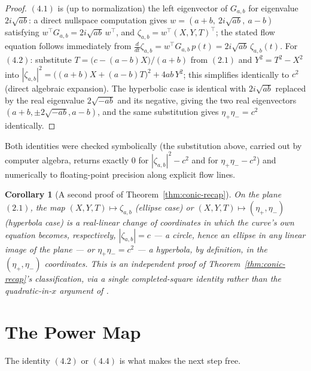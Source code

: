 \documentclass[11pt]{amsart}
\newtheorem{corollary}[theorem]{Corollary}
\theoremstyle{remark}
\begin{document}
\begin{proof}
$(4.1)$ is (up to normalization) the left eigenvector of $G_{a,b}$ for eigenvalue $2i\sqrt{ab}$: a direct nullspace computation gives $w=(a+b,\ 2i\sqrt{ab},\ a-b)$ satisfying $w^\top G_{a,b}=2i\sqrt{ab}\,w^\top$, and $\zeta_{a,b}=w^\top(X,Y,T)^\top$; the stated flow equation follows immediately from $\frac{d}{dt}\zeta_{a,b}=w^\top G_{a,b}\,p(t)=2i\sqrt{ab}\,\zeta_{a,b}(t)$. For $(4.2)$: substitute $T=\bigl(c-(a-b)X\bigr)/(a+b)$ from $(2.1)$ and $Y^2=T^2-X^2$ into $|\zeta_{a,b}|^2=\bigl((a+b)X+(a-b)T\bigr)^2+4ab\,Y^2$; this simplifies identically to $c^2$ (direct algebraic expansion). The hyperbolic case is identical with $2i\sqrt{ab}$ replaced by the real eigenvalue $2\sqrt{-ab}$ and its negative, giving the two real eigenvectors $(a+b,\pm2\sqrt{-ab},a-b)$, and the same substitution gives $\eta_+\eta_-=c^2$ identically.
\end{proof}

Both identities were checked symbolically (the substitution above, carried out by computer algebra, returns exactly $0$ for $|\zeta_{a,b}|^2-c^2$ and for $\eta_+\eta_--c^2$) and numerically to floating-point precision along explicit flow lines.

\begin{corollary}[A second proof of Theorem~\ref{thm:conic-recap}]
On the plane $(2.1)$, the map $(X,Y,T)\mapsto\zeta_{a,b}$ (ellipse case) or $(X,Y,T)\mapsto(\eta_+,\eta_-)$ (hyperbola case) is a real-linear change of coordinates in which the curve's own equation becomes, respectively, $|\zeta_{a,b}|=c$ --- a circle, hence an ellipse in any linear image of the plane --- or $\eta_+\eta_-=c^2$ --- a hyperbola, by definition, in the $(\eta_+,\eta_-)$ coordinates. This is an independent proof of Theorem~\ref{thm:conic-recap}'s classification, via a single completed-square identity rather than the quadratic-in-$x$ argument of \cite{Ebert2026Table}.
\end{corollary}

\section{The Power Map}

The identity $(4.2)$ or $(4.4)$ is what makes the next step free.
\end{document}
